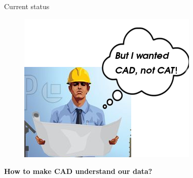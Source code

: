 \begin{frame}{Current status}
\begin{minipage}[t]{0.6\linewidth}
\begin{figure}
\includegraphics[width=0.9\linewidth]{Pictures/engineerThoughts2.png}
\end{figure}
\vspace{1.5mm}
\end{minipage}
\textbf{How to make CAD understand our data?}
\end{frame}

